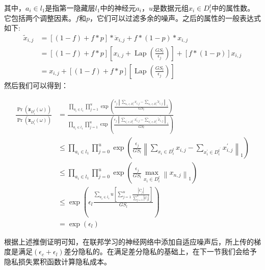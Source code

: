 其中，$a_{i} \in l_{1}$是指第一隐藏层$l_{1}$中的神经元$a_{i}$，$u$是数据元组$x_{i} \in D_{i}^{t}$中的属性数。它包括两个调整因素。$f$和$p$，它们可以过滤多余的噪声。之后的属性的一般表达式如下:
\begin{equation}
\begin{aligned}
\tilde{x}_{i, j} &=[(1-f)+f * p] * \ddot{x}_{i, j}+f *(1-p) * x_{i, j} \\
&=[(1-f)+f * p]\left[x_{i, j}+\operatorname{Lap}\left(\frac{G S_{l}}{\epsilon_{j}}\right)\right]+[f *(1-p)] x_{i, j} \\
&=x_{i, j}+[(1-f)+f * p]\left[\operatorname{Lap}\left(\frac{G S_{l}}{\epsilon_{j}}\right)\right]
\end{aligned}
\end{equation}
然后我们可以得到：

\begin{equation}
\begin{aligned}
\frac{\operatorname{Pr}\left(\ddot{\mathbf{z}}_{D_{i}^{t}}(\omega)\right)}{\operatorname{Pr}\left(\ddot{\mathbf{z}}_{D_{i}^{t}}(\omega)\right)} &=\frac{\prod_{a_{i} \in l_{1}} \prod_{j=1}^{u} \exp \left(\frac{\epsilon_{j}\left\|\sum_{x_{i} \in D_{i}^{t}} x_{i, j}-\sum_{x_{i} \in D_{i}^{t}} \tilde{x}_{i, j}\right\|_{1}}{G S_{l}}\right)}{\prod_{a_{i} \in l_{1}} \prod_{j=1}^{u} \exp \left(\frac{\epsilon_{j}\left\|\sum_{x_{i}^{\prime} \in D_{i}^{t^{\prime}}} x_{i, j}^{\prime}-\sum_{x_{i}^{\prime} \in D_{i}^{t^{\prime}}} \tilde{x}_{i, j}^{\prime}\right\|_{1}}{G S_{l}}\right)} \\
& \leq \prod_{a_{i} \in l_{1}} \prod_{j=0}^{u} \exp \left(\frac{\epsilon_{j}}{G S_{l}}\left\|\sum_{x_{i} \in D_{i}^{t}} x_{i, j}-\sum_{x_{i}^{\prime} \in D_{i}^{t^{\prime}}} x_{i, j}^{\prime}\right\|_{1}\right) \\
& \leq \prod_{a_{i} \in l_{1}} \prod_{j=0}^{u} \exp \left(\frac{\epsilon_{j}}{G S_{l}} \max _{x_{i} \in D_{i}^{t}}\left\|x_{n, j}\right\|_{1}\right) \\
& \leq \exp \left(\epsilon_{l} \frac{\sum_{a_{i} \in l_{1}} u\left[\sum_{j=1}^{u} \frac{\left|\ddot{C}_{j}\right|}{\sum_{j=1}^{u}\left|\ddot{C}_{j}\right|}\right]}{G S_{l}}\right) \\
&=\exp \left(\epsilon_{l}\right)
\end{aligned}
\end{equation}

根据上述推倒证明可知，在联邦学习的神经网络中添加自适应噪声后，所上传的梯度是满足$\left(\epsilon_{c}+\epsilon_{l}\right)$差分隐私的。在满足差分隐私的基础上，在下一节我们会给予隐私损失累积函数计算隐私成本。

